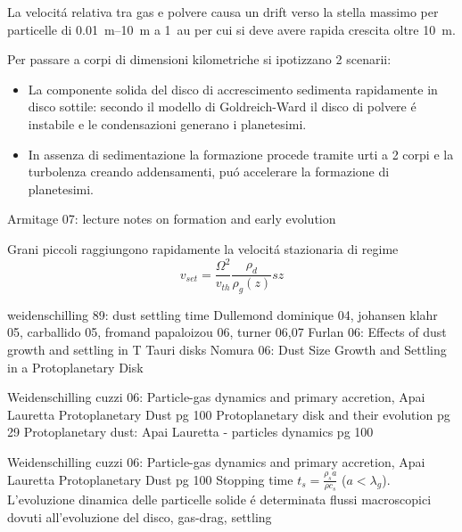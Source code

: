 La velocit\'a relativa tra gas e polvere causa un drift verso la stella massimo per particelle di \SIrange{0.01}{10}{\meter}  a \SI{1}{\astronomicalunit} per cui si deve avere rapida crescita oltre \SI{10}{\meter}.

Per passare a corpi di dimensioni kilometriche si ipotizzano 2 scenarii:
\begin{itemize}
\item La componente solida del disco di accrescimento sedimenta rapidamente in disco sottile: secondo il modello di Goldreich-Ward il disco di polvere \'e instabile e le condensazioni generano i planetesimi.
\item In assenza di sedimentazione la formazione procede tramite urti a 2 corpi e la turbolenza creando addensamenti, pu\'o accelerare la formazione di planetesimi.
\end{itemize}

\begin{workout}
Armitage 07: lecture notes on formation and early evolution
 \end{workout}

\begin{workout}	
Grani piccoli raggiungono rapidamente la velocit\'a stazionaria di regime
\begin{equation}
v_{set}=\frac{\Omega^2}{v_{th}}\frac{\rho_d}{\rho_g(z)}sz
\end{equation}
 \end{workout}
 
\begin{workout}
weidenschilling 89: dust settling time
Dullemond dominique 04, johansen klahr 05, carballido 05, fromand papaloizou 06, turner 06,07
Furlan 06: Effects of dust growth and settling in T Tauri disks
Nomura 06: Dust Size Growth and Settling in a Protoplanetary Disk
\cite{lissauer1993planet}
 \end{workout}

\begin{workout}
Weidenschilling cuzzi 06: Particle-gas dynamics and primary accretion, Apai Lauretta Protoplanetary Dust pg 100
Protoplanetary disk and their evolution pg 29
Protoplanetary dust: Apai Lauretta - particles dynamics pg 100
\end{workout}

\begin{workout}
Weidenschilling cuzzi 06: Particle-gas dynamics and primary accretion, Apai Lauretta Protoplanetary Dust pg 100
Stopping time $t_s=\frac{\rho_sa}{\rho c_s}$ ($a<\lambda_g$). L'evoluzione dinamica delle particelle solide \'e determinata flussi macroscopici dovuti all'evoluzione del disco, gas-drag, settling
\end{workout}

